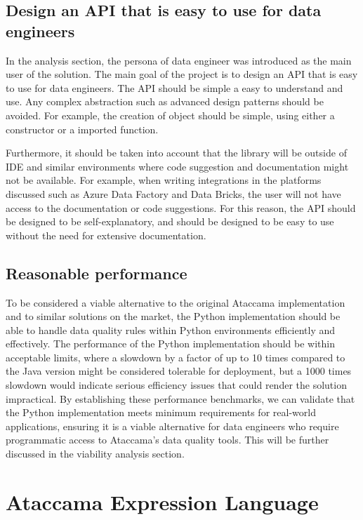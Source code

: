 \subsection{Design an API that is easy to use for data engineers}

In the analysis section, the persona of data engineer was introduced as the main user of the solution. The main goal of the project is to design an API that is easy to use for data engineers. The API should be simple a easy to understand and use. Any complex abstraction such as advanced design patterns should be avoided. For example, the creation of object should be simple, using either a constructor or a imported function. 

Furthermore, it should be taken into account that the library will be outside of IDE and similar environments where code suggestion and documentation might not be available. For example, when writing integrations in the platforms discussed such as Azure Data Factory and Data Bricks, the user will not have access to the documentation or code suggestions. For this reason, the API should be designed to be self-explanatory, and should be designed to be easy to use without the need for extensive documentation.

\subsection{Reasonable performance}

To be considered a viable alternative to the original Ataccama implementation and to similar solutions on the market, the Python implementation should be able to handle data quality rules within Python environments efficiently and effectively. The performance of the Python implementation should be within acceptable limits, where a slowdown by a factor of up to 10 times compared to the Java version might be considered tolerable for deployment, but a 1000 times slowdown would indicate serious efficiency issues that could render the solution impractical. By establishing these performance benchmarks, we can validate that the Python implementation meets minimum requirements for real-world applications, ensuring it is a viable alternative for data engineers who require programmatic access to Ataccama's data quality tools. This will be further discussed in the viability analysis section.

\section{Ataccama Expression Language}

